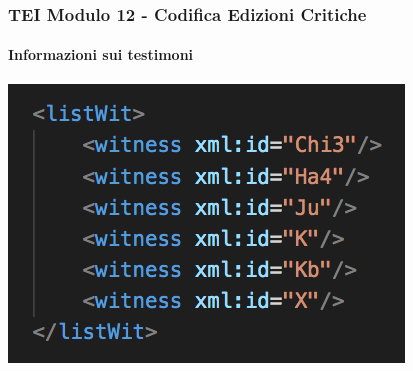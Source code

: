 \begin{frame}
    \frametitle{TEI Modulo 12 - Codifica Edizioni Critiche}
    \framesubtitle{Informazioni sui testimoni}
    \addtocounter{nframe}{1}
    
    
    \begin{center}
        \includegraphics[width=.95\textwidth]{imgs/listWit-base.png}
    \end{center}

\end{frame}


